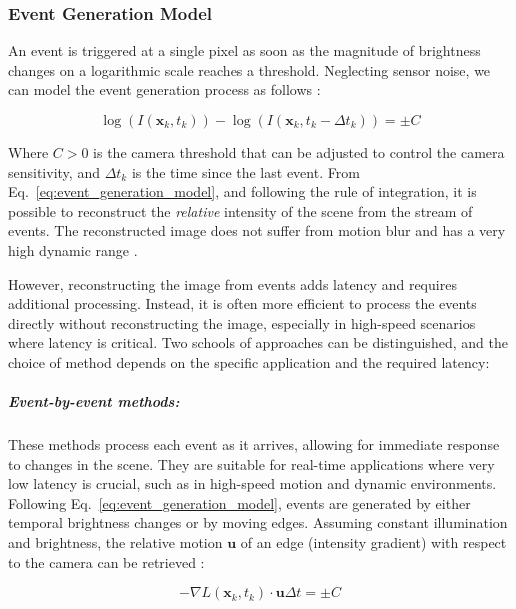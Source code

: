\documentclass{article}
\begin{document}
\subsubsection{Event Generation Model}\label{sec:event_generation_model}
An event is triggered at a single pixel as soon as the magnitude of brightness changes on a logarithmic scale reaches a threshold. Neglecting sensor noise, we can model the event generation process as follows \cite{gallegoEventbasedVisionSurvey2022}:

\begin{equation}\label{eq:event_generation_model}
    \log(I(\textbf{x}_k,t_k)) - \log(I(\textbf{x}_k,t_k-\Delta t_k)) = \pm C
\end{equation}
    
Where $C>0$ is the camera threshold that can be adjusted to control the camera sensitivity, and $\Delta t_k$ is the time since the last event. From Eq.~\eqref{eq:event_generation_model}, and following the rule of integration, it is possible to reconstruct the \textit{relative} intensity of the scene from the stream of events. The reconstructed image does not suffer from motion blur and has a very high dynamic range \cite{rebecqHighSpeedHigh2019}. 

However, reconstructing the image from events adds latency and requires additional processing. Instead, it is often more efficient to process the events directly without reconstructing the image, especially in high-speed scenarios where latency is critical. Two schools of approaches can be distinguished, and the choice of method depends on the specific application and the required latency:

\subparagraph{Event-by-event methods:} These methods process each event as it arrives, allowing for immediate response to changes in the scene. They are suitable for real-time applications where very low latency is crucial, such as in high-speed motion and dynamic environments. Following Eq.~\eqref{eq:event_generation_model}, events are generated by either temporal brightness changes or by moving edges. Assuming constant illumination and brightness, the relative motion $\textbf{u}$ of an edge (intensity gradient) with respect to the camera can be retrieved \cite{gallegoEventbasedVisionSurvey2022, gallegoEventbasedCameraPose2015}:

\begin{equation}\label{eq:moving_edges_event}
    -\nabla L(\textbf{x}_k,t_k) \cdot \textbf{u}\Delta t = \pm C    
\end{equation}
\end{document}
